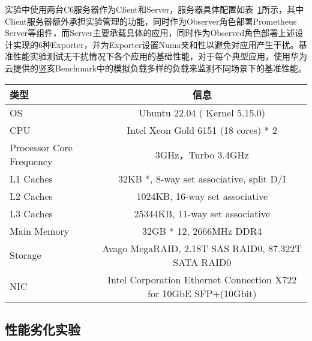 实验中使用两台C6服务器作为Client和Server，服务器具体配置如表~\ref{tab:c6_info}所示，其中Client服务器额外承担实验管理的功能，同时作为Observer角色部署Prometheus Server等组件，而Server主要承载具体的应用，同时作为Observed角色部署上述设计实现的6种Exporter，并为Exporter设置Numa亲和性以避免对应用产生干扰。基准性能实验测试无干扰情况下各个应用的基础性能，对于每个典型应用，使用华为云提供的竖亥Benchmark中的模拟负载多样的负载来监测不同场景下的基准性能。

\begin{table}[H]
    \label{tab:c6_info}
    \footnotesize%
    \setlength{\tabcolsep}{4pt}%
    \renewcommand{\arraystretch}{1.5}%
    \centering
    \begin{tabular}{lc}
        \hline
        类型 & 信息 \\
        \hline
        OS & Ubuntu 22.04 ( Kernel 5.15.0) \\
        CPU & Intel Xeon Gold 6151 (18 cores) * 2 \\
        Processor Core Frequency & 3GHz，Turbo 3.4GHz \\
        L1 Caches & 32KB *,  8-way set associative, split D/I \\
        L2 Caches & 1024KB, 16-way set associative \\
        L3 Caches & 25344KB, 11-way set associative \\
        Main Memory & 32GB * 12, 2666MHz DDR4 \\
        Storage & Avago MegaRAID, 2.18T SAS RAID0, 87.322T SATA RAID0 \\
        NIC & Intel Corporation Ethernet Connection X722 for 10GbE SFP+(10Gbit) \\
        \hline
    \end{tabular}
\end{table}







\subsection{性能劣化实验}


